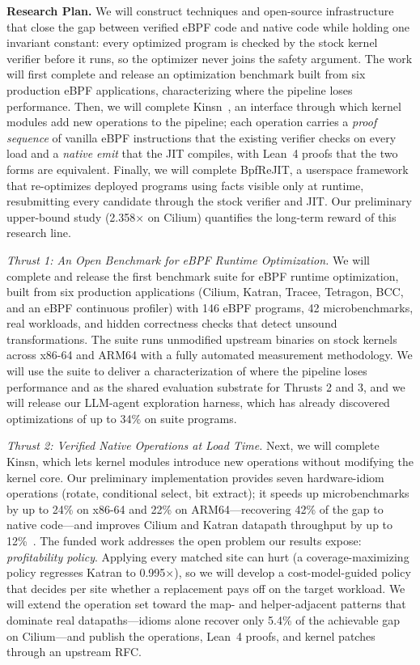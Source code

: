 \noindent \textbf{Research Plan.}  We will construct techniques and open-source infrastructure that close the gap between verified eBPF code and native code while holding one invariant constant: every optimized program is checked by the stock kernel verifier before it runs, so the optimizer never joins the safety argument.  The work will first complete and release an optimization benchmark built from six production eBPF applications, characterizing where the pipeline loses performance.  Then, we will complete Kinsn~\cite{zheng2026kinsn}, an interface through which kernel modules add new operations to the pipeline; each operation carries a \textit{proof sequence} of vanilla eBPF instructions that the existing verifier checks on every load and a \textit{native emit} that the JIT compiles, with Lean~4 proofs that the two forms are equivalent.  Finally, we will complete BpfReJIT, a userspace framework that re-optimizes deployed programs using facts visible only at runtime, resubmitting every candidate through the stock verifier and JIT.  Our preliminary upper-bound study (2.358$\times$ on Cilium) quantifies the long-term reward of this research line.

\textit{Thrust 1: An Open Benchmark for eBPF Runtime Optimization.}
We will complete and release the first benchmark suite for eBPF runtime optimization, built from six production applications (Cilium, Katran, Tracee, Tetragon, BCC, and an eBPF continuous profiler) with 146 eBPF programs, 42 microbenchmarks, real workloads, and hidden correctness checks that detect unsound transformations.  The suite runs unmodified upstream binaries on stock kernels across x86-64 and ARM64 with a fully automated measurement methodology.  We will use the suite to deliver a characterization of where the pipeline loses performance and as the shared evaluation substrate for Thrusts 2 and 3, and we will release our LLM-agent exploration harness, which has already discovered optimizations of up to 34\% on suite programs.

\textit{Thrust 2: Verified Native Operations at Load Time.}
Next, we will complete Kinsn, which lets kernel modules introduce new operations without modifying the kernel core.  Our preliminary implementation provides seven hardware-idiom operations (\eg rotate, conditional select, bit extract); it speeds up microbenchmarks by up to 24\% on x86-64 and 22\% on ARM64---recovering 42\% of the gap to native code---and improves Cilium and Katran datapath throughput by up to 12\%~\cite{zheng2026kinsn}.  The funded work addresses the open problem our results expose: \textit{profitability policy}.  Applying every matched site can hurt (a coverage-maximizing policy regresses Katran to 0.995$\times$), so we will develop a cost-model-guided policy that decides per site whether a replacement pays off on the target workload.  We will extend the operation set toward the map- and helper-adjacent patterns that dominate real datapaths---idioms alone recover only 5.4\% of the achievable gap on Cilium---and publish the operations, Lean~4 proofs, and kernel patches through an upstream RFC.

